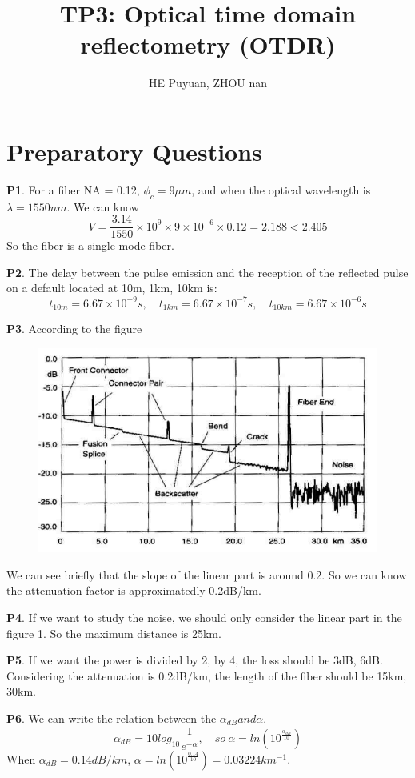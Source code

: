 \documentclass{article}
\title{\textbf{TP3: Optical time domain reflectometry (OTDR)}}
\author{ HE Puyuan, ZHOU nan }
\date{ }
\begin{document}
	\maketitle
	\setlength{\parindent}{0pt} %
	\section{Preparatory Questions}
	\textbf{P1}. For a fiber NA = 0.12, $\phi_c=9\mu m$, and when the optical wavelength is $\lambda=1550nm$. We can know 
	$$V = \frac{3.14}{1550}\times 10^{9}\times 9 \times 10^{-6}\times 0.12=2.188 < 2.405
	$$
	So the fiber is a single mode fiber.
	
	\textbf{P2}. The delay between the pulse emission and the reception of the reflected pulse on a default located at 10m, 1km, 10km is:
	$$t_{10m} = 6.67\times10^{-9}s, \quad t_{1km} = 6.67\times10^{-7}s, \quad t_{10km} = 6.67\times10^{-6}s$$
	
	\textbf{P3}. According to the figure
	\begin{figure}[H]
		\centering
		\includegraphics[width=0.7\linewidth]{"figure 6"}
		\caption{}
		\label{fig:figure-6}
	\end{figure}
	We can see briefly that the slope of the linear part is around 0.2. So we can know the attenuation factor is approximatedly 0.2dB/km.

	\textbf{P4}. If we want to study the noise, we should only consider the linear part in the figure 1. So the maximum distance is 25km.
	
	\textbf{P5}. If we want the power is divided by 2, by 4, the loss should be 3dB, 6dB. Considering the attenuation is 0.2dB/km, the length of the fiber should be 15km, 30km.
	
	\textbf{P6}. We can write the relation between the $\alpha_{dB} and \alpha$.
	$$\alpha_{dB}=10log_{10} \frac{1}{e^{-\alpha}}, \quad so \  \alpha=ln(10^{\frac{\alpha_{dB}}{10}})$$
	When $\alpha_{dB}=0.14dB/km$, $\alpha = ln(10^{\frac{0.14}{10}}) = 0.03224km^{-1}$.
	
\end{document}
